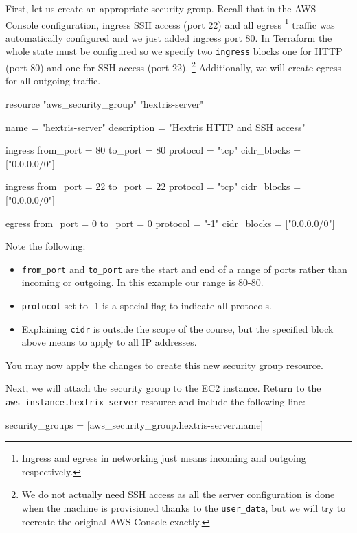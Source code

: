 \documentclass{csse4400}
\begin{document}
First, let us create an appropriate security group.
Recall that in the AWS Console configuration,
ingress SSH access (port 22) and all egress%
\footnote{Ingress and egress in networking just means incoming and outgoing respectively.}
traffic was automatically configured and we just added ingress port 80.
In Terraform the whole state must be configured so we specify two
\texttt{ingress} blocks one for HTTP (port 80) and one for SSH access (port 22).%
\footnote{We do not actually need SSH access as all the server configuration is done when the machine is provisioned thanks to the \texttt{user\_data},
but we will try to recreate the original AWS Console exactly.}
Additionally, we will create egress for all outgoing traffic.

\begin{code}[language=terraform]{}
resource "aws_security_group" "hextris-server" {
  name = "hextris-server"
  description = "Hextris HTTP and SSH access"

  ingress {
    from_port = 80
    to_port = 80
    protocol = "tcp"
    cidr_blocks = ["0.0.0.0/0"]
  }

  ingress {
    from_port = 22
    to_port = 22
    protocol = "tcp"
    cidr_blocks = ["0.0.0.0/0"]
  }

  egress {
    from_port = 0
    to_port = 0
    protocol = "-1"
    cidr_blocks = ["0.0.0.0/0"]
  }
}
\end{code}

Note the following:
\begin{itemize}
  \item \texttt{from\_port} and \texttt{to\_port} are the start and end of a range of ports rather than incoming or outgoing. In this example our range is 80-80.
  \item \texttt{protocol} set to -1 is a special flag to indicate all protocols.
  \item Explaining \texttt{cidr} is outside the scope of the course, but the specified block above means to apply to all IP addresses.
\end{itemize}

You may now apply the changes to create this new security group resource.

Next, we will attach the security group to the EC2 instance.
Return to the \texttt{aws\_instance.hextrix-server} resource
and include the following line:

\begin{code}[language=terraform]{}
security_groups = [aws_security_group.hextris-server.name]
\end{code}
\end{document}
